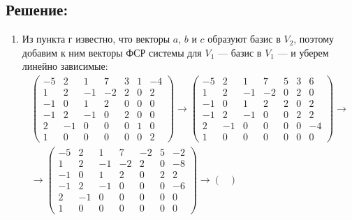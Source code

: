 \documentclass[12pt]{article}
\begin{document}
    \subsection*{Решение:}
    \begin{enumerate}
        \item
        Из пункта г известно, что векторы $a$, $b$ и $c$ образуют базис в $V_2$, поэтому добавим к ним векторы ФСР системы для $V_1$ --- базис в $V_1$ --- и уберем линейно зависимые:
        \begin{gather*}
            \begin{pmatrix}
                -5 & 2  & 1  & 7  & 3 & 1 & -4 \\
                1  & 2  & -1 & -2 & 2 & 0 & 2  \\
                -1 & 0  & 1  & 2  & 0 & 0 & 0  \\
                -1 & 2  & -1 & 0  & 2 & 0 & 0  \\
                2  & -1 & 0  & 0  & 0 & 1 & 0  \\
                1  & 0  & 0  & 0  & 0 & 0 & 2
            \end{pmatrix}
            \rightarrow
            \begin{pmatrix}
                -5 & 2  & 1  & 7  & 5 & 3 & 6  \\
                1  & 2  & -1 & -2 & 0 & 2 & 0  \\
                -1 & 0  & 1  & 2  & 2 & 0 & 2  \\
                -1 & 2  & -1 & 0  & 0 & 2 & 2  \\
                2  & -1 & 0  & 0  & 0 & 0 & -4 \\
                1  & 0  & 0  & 0  & 0 & 0 & 0
            \end{pmatrix}
            \rightarrow \\
            \rightarrow
            \begin{pmatrix}
                -5 & 2  & 1  & 7  & -2 & 5 & -2 \\
                1  & 2  & -1 & -2 & 2  & 0 & -8 \\
                -1 & 0  & 1  & 2  & 0  & 2 & 2  \\
                -1 & 2  & -1 & 0  & 0  & 0 & -6 \\
                2  & -1 & 0  & 0  & 0  & 0 & 0  \\
                1  & 0  & 0  & 0  & 0  & 0 & 0
            \end{pmatrix}
            \rightarrow
            \begin{pmatrix}

\end{pmatrix}
\end{gather*}
\end{enumerate}
\end{document}
